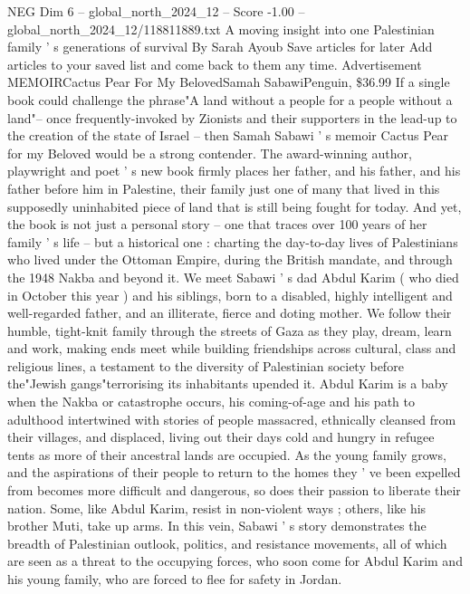 \begin{textsample}{NEG Dim 6 – global\_north\_2024\_12 – Score -1.00 – global\_north\_2024\_12/118811889.txt}  \label{ex:f6_neg_180}
A moving insight into one Palestinian family ' s generations of survival By Sarah Ayoub Save articles for later Add articles to your saved list and come back to them any time.
Advertisement MEMOIRCactus Pear For My BelovedSamah SabawiPenguin, \$36.99 If a single book could challenge the phrase"A land without a people for a people without a land"-- once frequently-invoked by Zionists and their supporters in the lead-up to the creation of the state of Israel -- then Samah Sabawi ' s memoir Cactus Pear for my Beloved would be a strong contender.
The award-winning author, playwright and poet ' s new book firmly places her father, and his father, and his father before him in Palestine, their family just one of many that lived in this supposedly uninhabited piece of land that is still being fought for today.
And yet, the book is not just a personal story -- one that traces over 100 years of her family ' s life -- but a historical one : charting the day-to-day lives of Palestinians who lived under the Ottoman Empire, during the British mandate, and through the 1948 Nakba and beyond it.
We meet Sabawi ' s dad Abdul Karim ( who died in October this year ) and his siblings, born to a disabled, highly intelligent and well-regarded father, and an illiterate, fierce and doting mother.
We follow their humble, tight-knit family through the streets of Gaza as they play, dream, learn and work, making ends meet while building friendships across cultural, class and religious lines, a testament to the diversity of Palestinian society before the"Jewish gangs"terrorising its inhabitants upended it.
Abdul Karim is a baby when the Nakba or catastrophe occurs, his coming-of-age and his path to adulthood intertwined with stories of people massacred, ethnically cleansed from their villages, and displaced, living out their days cold and hungry in refugee tents as more of their ancestral lands are occupied.
As the young family grows, and the aspirations of their people to return to the homes they ' ve been expelled from becomes more difficult and dangerous, so does their passion to liberate their nation.
Some, like Abdul Karim, resist in non-violent ways ; others, like his brother Muti, take up arms.
In this vein, Sabawi ' s story demonstrates the breadth of Palestinian outlook, politics, and resistance movements, all of which are seen as a threat to the occupying forces, who soon come for Abdul Karim and his young family, who are forced to flee for safety in Jordan.

\end{textsample}
